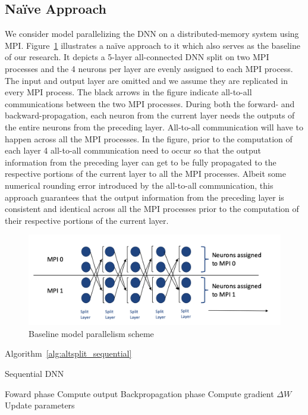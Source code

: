 \subsection{Na\"{i}ve Approach}
We consider model parallelizing the DNN on a distributed-memory system using 
MPI. Figure~\ref{fig:altsplit_baseline} illustrates a na\"{i}ve approach to it 
which also serves as the baseline of our research. It depicts a 5-layer 
all-connected DNN split on two MPI processes and the 4 neurons per layer are 
evenly assigned to each MPI process. The input and output layer are omitted and 
we assume they are replicated in every MPI process. The black arrows in the 
figure indicate all-to-all communications between the two MPI processes. During 
both the forward- and backward-propagation, each neuron from the current layer 
needs the outputs of the entire neurons from the preceding layer. All-to-all 
communication will have to happen across all the MPI processes. In the figure, 
prior to the computation of each layer 4 all-to-all communication need to occur 
so that the output information from the preceding layer can get to be fully 
propagated to the respective portions of the current layer to all the MPI 
processes.  Albeit some numerical rounding error introduced by the all-to-all 
communication, this approach guarantees that the output information from the 
preceding layer is consistent and identical across all the MPI processes prior 
to the computation of their respective portions of the current layer.
\begin{figure}[H]
    \centerline{\includegraphics[scale=0.60]{altsplit/figs/baseline.png}}
    \caption{Baseline model parallelism scheme}
    \label{fig:altsplit_baseline}
\end{figure}

Algorithm~\ref{alg:altsplit_sequential}
\begin{algorithm}[H]%
\caption{Sequential DNN}
\label{alg:altsplit_sequential}
{\fontsize{10}{10}\selectfont
\begin{algorithmic}[1]
    \Comment Foward phase
            \State Compute output
        \EndFor
    \EndFor
    \Comment Backpropagation phase
            \State Compute gradient $\Delta W$
        \EndFor
    \EndFor
    \State Update parameters
\end{algorithmic}}
\end{algorithm}

